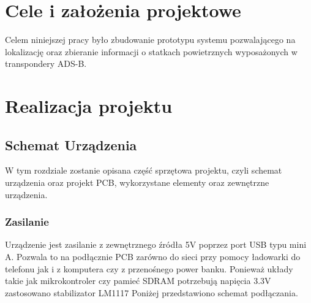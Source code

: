 \documentclass[eng,printmode]{mgr}
\begin{document}



\chapter{ Cele i założenia projektowe }
Celem niniejszej pracy by\l{}o zbudowanie prototypu systemu pozwalającego na lokalizację oraz zbieranie informacji o  statkach powietrznych wyposażonych w transpondery ADS-B.


\chapter{ Realizacja projektu }
\section{ Schemat Urządzenia}
W tym rozdziale zostanie opisana czę\'s\'c sprzętowa projektu, czyli schemat urządzenia oraz projekt PCB, wykorzystane elementy oraz zewnętrzne urządzenia.
\subsection{Zasilanie}
Urządzenie jest zasilanie z zewnętrznego źródła 5V poprzez port USB typu mini A. Pozwala to na podłącznie PCB zarówno do sieci przy pomocy ładowarki do telefonu jak i z komputera czy z przenośnego power banku. Ponieważ układy takie jak mikrokontroler czy pamieć SDRAM potrzebują napięcia 3.3V zastosowano stabilizator LM1117 Poniżej przedstawiono schemat podłączania.
\end{document}
